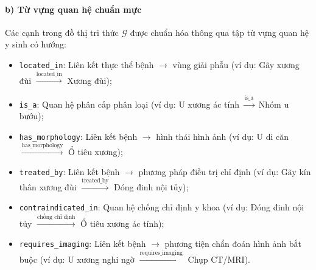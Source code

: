 \paragraph{b) Từ vựng quan hệ chuẩn mực}
Các cạnh trong đồ thị tri thức $\mathcal{G}$ được chuẩn hóa thông qua tập từ vựng quan hệ y sinh có hướng:
\begin{itemize}
    \item \texttt{located\_in}: Liên kết thực thể bệnh $\rightarrow$ vùng giải phẫu (ví dụ: Gãy xương đùi $\xrightarrow{\text{located\_in}}$ Xương đùi);
    \item \texttt{is\_a}: Quan hệ phân cấp phân loại (ví dụ: U xương ác tính $\xrightarrow{\text{is\_a}}$ Nhóm u bướu);
    \item \texttt{has\_morphology}: Liên kết bệnh $\rightarrow$ hình thái hình ảnh (ví dụ: U di căn $\xrightarrow{\text{has\_morphology}}$ Ổ tiêu xương);
    \item \texttt{treated\_by}: Liên kết bệnh $\rightarrow$ phương pháp điều trị chỉ định (ví dụ: Gãy kín thân xương đùi $\xrightarrow{\text{treated\_by}}$ Đóng đinh nội tủy);
    \item \texttt{contraindicated\_in}: Quan hệ chống chỉ định y khoa (ví dụ: Đóng đinh nội tủy $\xrightarrow{\text{chống chỉ định}}$ Ổ tiêu xương ác tính);
    \item \texttt{requires\_imaging}: Liên kết bệnh $\rightarrow$ phương tiện chẩn đoán hình ảnh bắt buộc (ví dụ: U xương nghi ngờ $\xrightarrow{\text{requires\_imaging}}$ Chụp CT/MRI).
\end{itemize}

